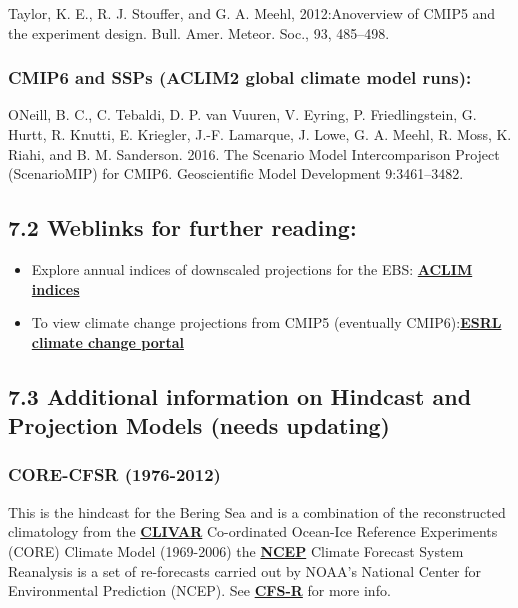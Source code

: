 \documentclass[
]{article}
\begin{document}
Taylor, K. E., R. J. Stouffer, and G. A. Meehl, 2012:Anoverview of CMIP5
and the experiment design. Bull. Amer. Meteor. Soc., 93, 485--498.

\hypertarget{cmip6-and-ssps-aclim2-global-climate-model-runs}{%
\subsubsection{CMIP6 and SSPs (ACLIM2 global climate model
runs):}\label{cmip6-and-ssps-aclim2-global-climate-model-runs}}

ONeill, B. C., C. Tebaldi, D. P. van Vuuren, V. Eyring, P.
Friedlingstein, G. Hurtt, R. Knutti, E. Kriegler, J.-F. Lamarque, J.
Lowe, G. A. Meehl, R. Moss, K. Riahi, and B. M. Sanderson. 2016. The
Scenario Model Intercomparison Project (ScenarioMIP) for CMIP6.
Geoscientific Model Development 9:3461--3482.

\hypertarget{weblinks-for-further-reading}{%
\subsection{7.2 Weblinks for further
reading:}\label{weblinks-for-further-reading}}

\begin{itemize}
\item
  Explore annual indices of downscaled projections for the EBS:
  \href{https://kholsman.shinyapps.io/aclim/}{\textbf{ACLIM indices}}
\item
  To view climate change projections from CMIP5 (eventually
  CMIP6):\href{https://www.esrl.noaa.gov/psd/ipcc/ocn/}{\textbf{ESRL
  climate change portal }}
\end{itemize}

\hypertarget{additional-information-on-hindcast-and-projection-models-needs-updating}{%
\subsection{7.3 Additional information on Hindcast and Projection Models
(needs
updating)}\label{additional-information-on-hindcast-and-projection-models-needs-updating}}

\hypertarget{core-cfsr-1976-2012}{%
\subsubsection{CORE-CFSR (1976-2012)}\label{core-cfsr-1976-2012}}

This is the hindcast for the Bering Sea and is a combination of the
reconstructed climatology from the
\href{http://portal.aoos.org/bering-sea.php\#module-metadata/5626a0b6-7d79-11e3-ac17-00219bfe5678/0756e6c2-a8e2-40af-aa3d-22051ed68067}{\textbf{CLIVAR}}
Co-ordinated Ocean-Ice Reference Experiments (CORE) Climate Model
(1969-2006) the
\href{http://portal.aoos.org/bering-sea.php\#module-metadata/f8cb79f6-7d59-11e3-a6ee-00219bfe5678/2deb2eca-f3f5-4eda-a132-112468711de7}{\textbf{NCEP}}
Climate Forecast System Reanalysis is a set of re-forecasts carried out
by NOAA's National Center for Environmental Prediction (NCEP). See
\href{http://cfs.ncep.noaa.gov/cfsr/}{\textbf{CFS-R}} for more info.
\end{document}
